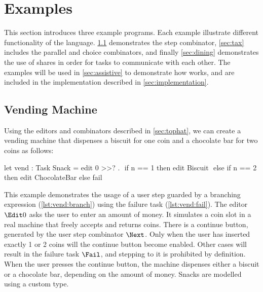 
\section{Examples}
\label{sec:examples}

This section introduces three example \TOPHAT programs.
Each example illustrate different functionality of the \TOPHAT language.
\cref{sec:vending} demonstrates the step combinator, \cref{sec:tax} includes the parallel and choice combinators, and finally \cref{sec:dining} demonstrates the use of shares in order for tasks to communicate with each other.
The examples will be used in \cref{sec:assistive} to demonstrate how \ASTOPHAT works, and are included in the implementation described in \cref{sec:implementation}.


\subsection{Vending Machine}
\label{sec:vending}

Using the editors and combinators described in \cref{sec:tophat},
we can create a vending machine that dispenses a biscuit for one coin and a chocolate bar for two coins as follows:


\begin{TASK}[
    float=ht,
    numbers=right,
    caption={Vending machine dispensing biscuits or chocolate.},
    captionpos=b,
    label=lst:vending]
  let vend : Task Snack = edit 0 >>? \n.    $\label{lst:vend:enter}$
    if n == 1 then edit Biscuit             $\label{lst:vend:branch}$
    else if n == 2 then edit ChocolateBar
    else fail                               $\label{lst:vend:fail}$
\end{TASK}

This example demonstrates the usage of a user step guarded by a branching expression (\cref{lst:vend:branch}) using the failure task (\cref{lst:vend:fail}).
The editor $\Edit 0$ asks the user to enter an amount of money.
It simulates a coin slot in a real machine that freely accepts and returns coins.
There is a continue button, generated by the user step combinator $\Next$.
Only when the user has inserted exactly 1 or 2 coins will the continue button become enabled.
Other cases will result in the failure task $\Fail$, and stepping to it is prohibited by definition.
When the user presses the continue button, the machine dispenses either a biscuit or a chocolate bar, depending on the amount of money.
Snacks are modelled using a custom type.


